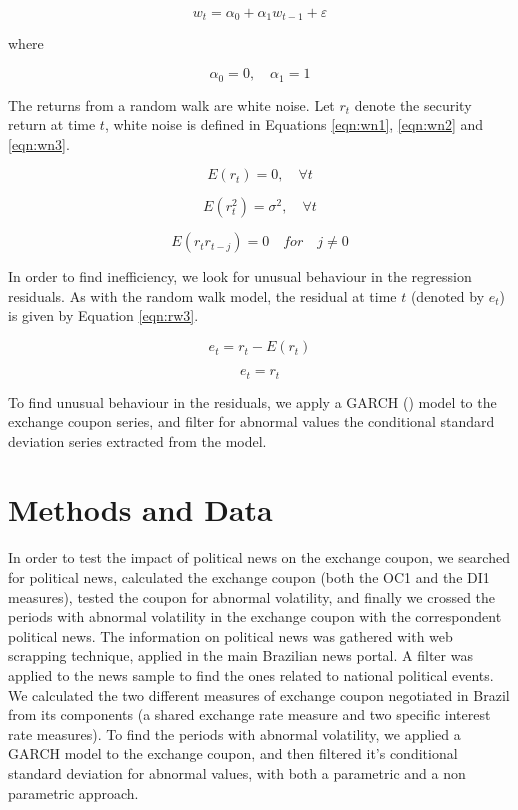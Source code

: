 \documentclass[cic,tc, english]{iiufrgs}
\begin{document}
    \begin{equation}
        \label{eqn:rw1}
        w_t = \alpha_0 + \alpha_1 w_{t-1} + \varepsilon
    \end{equation}

    where

    $$\alpha_0 = 0, \quad \alpha_1 = 1$$

    The returns from a random walk are white noise. Let $r_{t}$ denote the security return at time $t$, white noise is defined in Equations \ref{eqn:wn1}, \ref{eqn:wn2} and \ref{eqn:wn3}.
    
    \begin{equation}
        \label{eqn:wn1}
        E(r_t) = 0, \quad \forall t
    \end{equation}
    
    \begin{equation}
        \label{eqn:wn2}
        E(r_t^2) = \sigma^2, \quad \forall t
    \end{equation}
    
    \begin{equation}
        \label{eqn:wn3}
        E(r_tr_{t-j}) = 0 \quad for \quad j \neq 0
    \end{equation}

    In order to find inefficiency, we look for unusual behaviour in the regression residuals. As with the random walk model, the residual at time $t$ (denoted by $e_t$) is given by Equation \ref{eqn:rw3}.

    $$e_t = r_t - E(r_t)$$

    \begin{equation}
        \label{eqn:rw3}
        e_t = r_t
    \end{equation}

    To find unusual behaviour in the residuals, we apply a GARCH (\citet{bollerslev1986}) model to the exchange coupon series, and filter for abnormal values the conditional standard deviation series extracted from the model.
    

\chapter{Methods and Data} \label{chapter_methods_data}

    In order to test the impact of political news on the exchange coupon, we searched for political news, calculated the exchange coupon (both the OC1 and the DI1 measures), tested the coupon for abnormal volatility, and finally we crossed the periods with abnormal volatility in the exchange coupon with the correspondent political news. The information on political news was gathered with web scrapping technique, applied in the main Brazilian news portal. A filter was applied to the news sample to find the ones related to national political events. We calculated the two different measures of exchange coupon negotiated in Brazil from its components (a shared exchange rate measure and two specific interest rate measures). To find the periods with abnormal volatility, we applied a GARCH model to the exchange coupon, and then filtered it's conditional standard deviation for abnormal values, with both a parametric and a non parametric approach.
\end{document}
